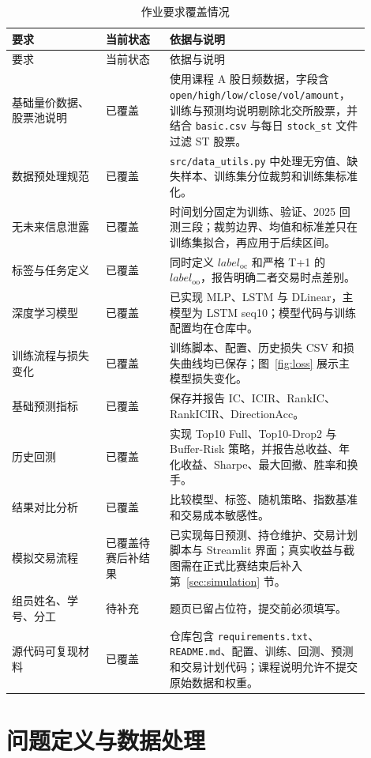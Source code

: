 \documentclass[UTF8,a4paper,11pt]{ctexart}
\begin{document}
\begin{longtable}{p{0.25\linewidth}p{0.17\linewidth}p{0.48\linewidth}}
\caption{作业要求覆盖情况}\label{tab:requirement-check}\\
\toprule
要求 & 当前状态 & 依据与说明 \\
\midrule
\endfirsthead
\toprule
要求 & 当前状态 & 依据与说明 \\
\midrule
\endhead
基础量价数据、股票池说明 & 已覆盖 & 使用课程 A 股日频数据，字段含 \texttt{open/high/low/close/vol/amount}，训练与预测均说明剔除北交所股票，并结合 \texttt{basic.csv} 与每日 \texttt{stock\_st} 文件过滤 ST 股票。 \\
数据预处理规范 & 已覆盖 & \texttt{src/data\_utils.py} 中处理无穷值、缺失样本、训练集分位裁剪和训练集标准化。 \\
无未来信息泄露 & 已覆盖 & 时间划分固定为训练、验证、2025 回测三段；裁剪边界、均值和标准差只在训练集拟合，再应用于后续区间。 \\
标签与任务定义 & 已覆盖 & 同时定义 $label_{\mathrm{oc}}$ 和严格 T+1 的 $label_{\mathrm{oo}}$，报告明确二者交易时点差别。 \\
深度学习模型 & 已覆盖 & 已实现 MLP、LSTM 与 DLinear，主模型为 LSTM seq10；模型代码与训练配置均在仓库中。 \\
训练流程与损失变化 & 已覆盖 & 训练脚本、配置、历史损失 CSV 和损失曲线均已保存；图~\ref{fig:loss} 展示主模型损失变化。 \\
基础预测指标 & 已覆盖 & 保存并报告 IC、ICIR、RankIC、RankICIR、DirectionAcc。 \\
历史回测 & 已覆盖 & 实现 Top10 Full、Top10-Drop2 与 Buffer-Risk 策略，并报告总收益、年化收益、Sharpe、最大回撤、胜率和换手。 \\
结果对比分析 & 已覆盖 & 比较模型、标签、随机策略、指数基准和交易成本敏感性。 \\
模拟交易流程 & 已覆盖待赛后补结果 & 已实现每日预测、持仓维护、交易计划脚本与 Streamlit 界面；真实收益与截图需在正式比赛结束后补入第~\ref{sec:simulation} 节。 \\
组员姓名、学号、分工 & 待补充 & 题页已留占位符，提交前必须填写。 \\
源代码可复现材料 & 已覆盖 & 仓库包含 \texttt{requirements.txt}、\texttt{README.md}、配置、训练、回测、预测和交易计划代码；课程说明允许不提交原始数据和权重。 \\
\bottomrule
\end{longtable}

\section{问题定义与数据处理}
\end{document}
